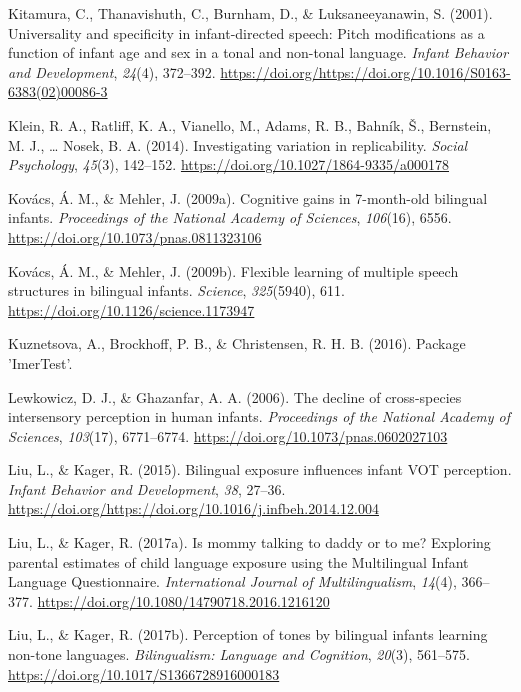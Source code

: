 \documentclass[
  english,
  ,man,floatsintext]{apa6}
\begin{document}
\leavevmode\hypertarget{ref-kitamura_2001}{}%
Kitamura, C., Thanavishuth, C., Burnham, D., \& Luksaneeyanawin, S. (2001). Universality and specificity in infant-directed speech: Pitch modifications as a function of infant age and sex in a tonal and non-tonal language. \emph{Infant Behavior and Development}, \emph{24}(4), 372--392. \url{https://doi.org/https://doi.org/10.1016/S0163-6383(02)00086-3}

\leavevmode\hypertarget{ref-klein_2014}{}%
Klein, R. A., Ratliff, K. A., Vianello, M., Adams, R. B., Bahník, Š., Bernstein, M. J., \ldots{} Nosek, B. A. (2014). Investigating variation in replicability. \emph{Social Psychology}, \emph{45}(3), 142--152. \url{https://doi.org/10.1027/1864-9335/a000178}

\leavevmode\hypertarget{ref-kovacs_2009a}{}%
Kovács, Á. M., \& Mehler, J. (2009a). Cognitive gains in 7-month-old bilingual infants. \emph{Proceedings of the National Academy of Sciences}, \emph{106}(16), 6556. \url{https://doi.org/10.1073/pnas.0811323106}

\leavevmode\hypertarget{ref-kovacs_2009b}{}%
Kovács, Á. M., \& Mehler, J. (2009b). Flexible learning of multiple speech structures in bilingual infants. \emph{Science}, \emph{325}(5940), 611. \url{https://doi.org/10.1126/science.1173947}

\leavevmode\hypertarget{ref-kuznetsova_2016}{}%
Kuznetsova, A., Brockhoff, P. B., \& Christensen, R. H. B. (2016). Package 'ImerTest'.

\leavevmode\hypertarget{ref-lewkowicz_2006}{}%
Lewkowicz, D. J., \& Ghazanfar, A. A. (2006). The decline of cross-species intersensory perception in human infants. \emph{Proceedings of the National Academy of Sciences}, \emph{103}(17), 6771--6774. \url{https://doi.org/10.1073/pnas.0602027103}

\leavevmode\hypertarget{ref-liu_2015}{}%
Liu, L., \& Kager, R. (2015). Bilingual exposure influences infant VOT perception. \emph{Infant Behavior and Development}, \emph{38}, 27--36. \url{https://doi.org/https://doi.org/10.1016/j.infbeh.2014.12.004}

\leavevmode\hypertarget{ref-liu_2017a}{}%
Liu, L., \& Kager, R. (2017a). Is mommy talking to daddy or to me? Exploring parental estimates of child language exposure using the Multilingual Infant Language Questionnaire. \emph{International Journal of Multilingualism}, \emph{14}(4), 366--377. \url{https://doi.org/10.1080/14790718.2016.1216120}

\leavevmode\hypertarget{ref-liu_2017b}{}%
Liu, L., \& Kager, R. (2017b). Perception of tones by bilingual infants learning non-tone languages. \emph{Bilingualism: Language and Cognition}, \emph{20}(3), 561--575. \url{https://doi.org/10.1017/S1366728916000183}
\end{document}
